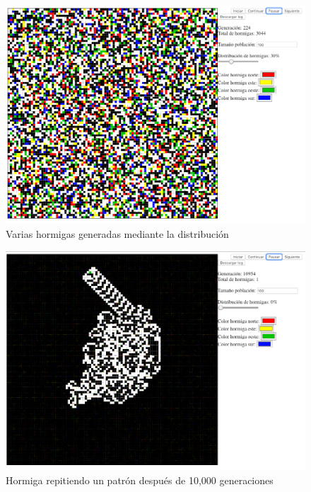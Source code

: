 		\begin{figure}[H]
			\begin{center}
				\includegraphics[scale=.3]{HL/img/varias.png}
				\caption{Varias hormigas generadas mediante la distribución}
				\label{fig:hl1}
			\end{center}
		\end{figure}

		\begin{figure}[H]
			\begin{center}
				\includegraphics[scale=.3]{HL/img/hormiga.png}
				\caption{Hormiga repitiendo un patrón después de 10,000 generaciones}
				\label{fig:hl1}
			\end{center}
		\end{figure}

